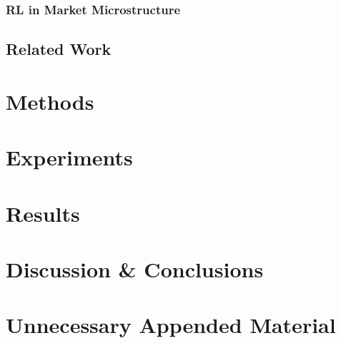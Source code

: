 \documentclass{kththesis}
\theoremstyle{definition}
\begin{document}
\subsection{RL in Market Microstructure}





\section{Related Work}


\chapter{Methods}

\chapter{Experiments}

\chapter{Results}

\chapter{Discussion \& Conclusions}

\printbibliography[heading=bibintoc] %

\appendix

\chapter{Unnecessary Appended Material}
\end{document}
